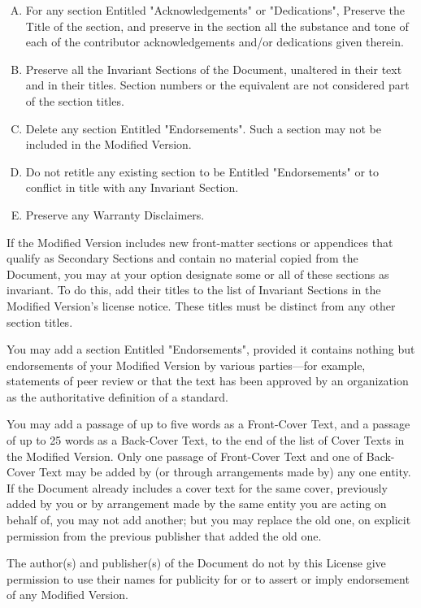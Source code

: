 \begin{enumerate}[A.]
\item For any section Entitled "Acknowledgements" or "Dedications", Preserve the Title of the section, and preserve in the section all the substance and 
tone of each of the contributor acknowledgements and/or dedications given therein. 
\item Preserve all the Invariant Sections of the Document, unaltered in their text and in their titles. Section numbers or the equivalent are not considered 
part of the section titles. 
\item Delete any section Entitled "Endorsements". Such a section may not be included in the Modified Version. 
\item Do not retitle any existing section to be Entitled "Endorsements" or to conflict in title with any Invariant Section. 
\item Preserve any Warranty Disclaimers.
\end{enumerate}

If the Modified Version includes new front-matter sections or appendices that qualify as Secondary Sections and contain no material copied from the Document, 
you may at your option designate some or all of these sections as invariant. To do this, add their titles to the list of Invariant Sections in the Modified 
Version's license notice. These titles must be distinct from any other section titles.

You may add a section Entitled "Endorsements", provided it contains nothing but endorsements of your Modified Version by various parties—for example, 
statements of peer review or that the text has been approved by an organization as the authoritative definition of a standard.

You may add a passage of up to five words as a Front-Cover Text, and a passage of up to 25 words as a Back-Cover Text, to the end of the list of Cover 
Texts in the Modified Version. Only one passage of Front-Cover Text and one of Back-Cover Text may be added by (or through arrangements made by) any one entity. 
If the Document already includes a cover text for the same cover, previously added by you or by arrangement made by the same entity you are acting on behalf of, 
you may not add another; but you may replace the old one, on explicit permission from the previous publisher that added the old one.

The author(s) and publisher(s) of the Document do not by this License give permission to use their names for publicity for or to assert or imply endorsement 
of any Modified Version.



